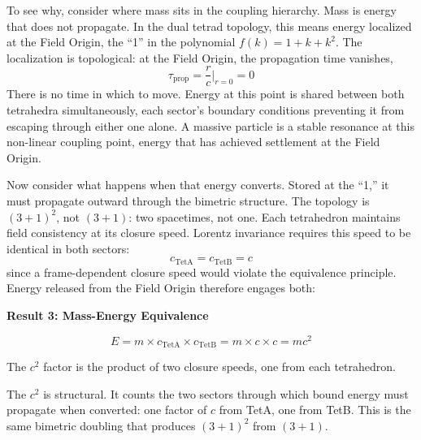 \documentclass[aps,prd,preprint,superscriptaddress,showpacs,preprintnumbers,amsmath,amssymb,nofootinbib]{revtex4-2}
\begin{document}
To see why, consider where mass sits in the coupling hierarchy. Mass is energy that does not propagate. In the dual tetrad topology, this means energy localized at the Field Origin, the ``1'' in the polynomial $f(k) = 1 + k + k^2$. The localization is topological: at the Field Origin, the propagation time vanishes,
\begin{equation}
\tau_{\text{prop}} = \frac{r}{c}\bigg|_{r=0} = 0
\label{eq:tau-zero-mass}
\end{equation}
There is no time in which to move. Energy at this point is shared between both tetrahedra simultaneously, each sector's boundary conditions preventing it from escaping through either one alone. A massive particle is a stable resonance at this non-linear coupling point, energy that has achieved settlement at the Field Origin.

Now consider what happens when that energy converts. Stored at the ``1,'' it must propagate outward through the bimetric structure. The topology is $(3+1)^2$, not $(3+1)$: two spacetimes, not one. Each tetrahedron maintains field consistency at its closure speed. Lorentz invariance requires this speed to be identical in both sectors:
\begin{equation}
c_{\text{TetA}} = c_{\text{TetB}} = c
\label{eq:closure-speeds}
\end{equation}
since a frame-dependent closure speed would violate the equivalence principle. Energy released from the Field Origin therefore engages both:

\vspace{1.5em}
\noindent
\colorbox{resultgreen}{\parbox{\dimexpr\textwidth-2\fboxsep\relax}{%
\vspace{0.8em}
\centering
\textbf{\large Result 3: Mass-Energy Equivalence}

\vspace{0.5em}
\boldmath
\begin{equation}
E = m \times c_{\text{TetA}} \times c_{\text{TetB}} = m \times c \times c = mc^2
\end{equation}
\unboldmath

\vspace{0.3em}
The $c^2$ factor is the product of two closure speeds, one from each tetrahedron.
\vspace{0.5em}
}}
\vspace{1cm}

The $c^2$ is structural. It counts the two sectors through which bound energy must propagate when converted: one factor of $c$ from TetA, one from TetB. This is the same bimetric doubling that produces $(3+1)^2$ from $(3+1)$.
\end{document}
